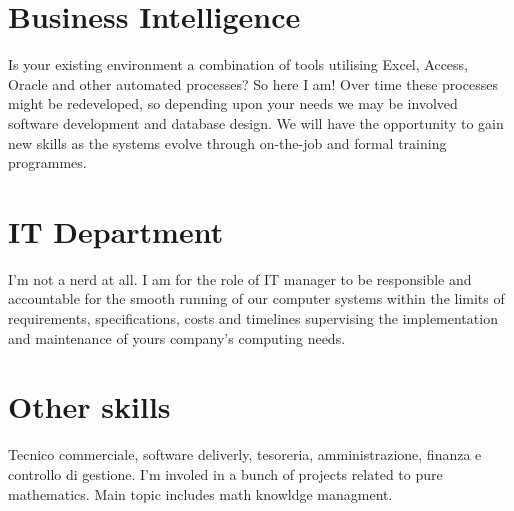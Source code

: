 \documentclass{article}
\begin{document}
	\begin{multicols}{3}
		\section*{Business Intelligence}
		Is your existing environment a combination of tools utilising Excel, Access, Oracle and other automated processes? So here I am! Over time these processes might be redeveloped, so depending upon your needs we may be involved software development and database design. We will have the opportunity to gain new skills as the systems evolve through on-the-job and formal training programmes.
		\vfill\null			
		\columnbreak
		
		\section*{IT Department}
		I'm not a nerd at all. I am for the role of IT manager to be responsible and accountable for the smooth running of our computer systems within the limits of requirements, specifications, costs and timelines supervising the implementation and maintenance of yours company’s computing needs.
		\vfill\null			
		\columnbreak
		
		\section*{Other skills}
		Tecnico commerciale, software deliverly, tesoreria, amministrazione, finanza e controllo di gestione.
		\medskip
		I'm involed in a bunch of projects related to pure mathematics. Main topic includes math knowldge managment.
		
	\end{multicols}
	
\end{document}
